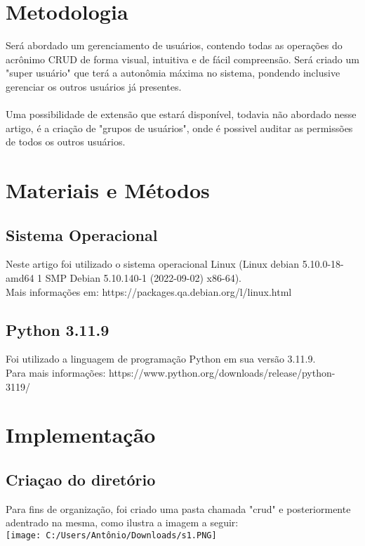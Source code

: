 \documentclass[11pt]{article} %
\begin{document}
\maketitle
\section{Metodologia}
Será abordado um gerenciamento de usuários, contendo todas as operações do acrônimo CRUD de forma visual, intuitiva e de fácil compreensão. Será criado um "super usuário" que terá a autonômia máxima no sistema, pondendo inclusive gerenciar os outros usuários já presentes.\\\\
Uma possibilidade de extensão que estará disponível, todavia não abordado nesse artigo, é a criação de "grupos de usuários", onde é possivel auditar as permissões de todos os outros usuários.

\maketitle
\section{Materiais e Métodos}
\subsection{Sistema Operacional}
Neste artigo foi utilizado o sistema operacional Linux (Linux debian 5.10.0-18-amd64 1 SMP Debian 5.10.140-1 (2022-09-02) x86-64). \\Mais informações em: https://packages.qa.debian.org/l/linux.html 
\subsection{Python 3.11.9}
Foi utilizado a linguagem de programação Python em sua versão 3.11.9.\\ Para mais informações: https://www.python.org/downloads/release/python-3119/

\maketitle
\section{Implementação}
\subsection{Criaçao do diretório}
Para fins de organização, foi criado uma pasta chamada "crud" e posteriormente adentrado na mesma, como ilustra a imagem a seguir:\\
\texttt{[image: C:/Users/Antônio/Downloads/s1.PNG]}
\end{document}
